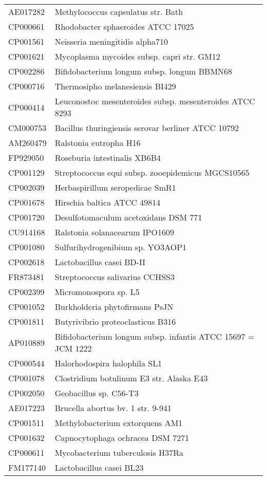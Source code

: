 \begin{longtable}{ll}
AE017282 & Methylococcus capsulatus str. Bath\\
CP000661 & Rhodobacter sphaeroides ATCC 17025\\
CP001561 & Neisseria meningitidis alpha710\\
CP001621 & Mycoplasma mycoides subsp. capri str. GM12\\
CP002286 & Bifidobacterium longum subsp. longum BBMN68\\
CP000716 & Thermosipho melanesiensis BI429\\
CP000414 & Leuconostoc mesenteroides subsp. mesenteroides ATCC 8293\\
CM000753 & Bacillus thuringiensis serovar berliner ATCC 10792\\
AM260479 & Ralstonia eutropha H16\\
FP929050 & Roseburia intestinalis XB6B4\\
CP001129 & Streptococcus equi subsp. zooepidemicus MGCS10565\\
CP002039 & Herbaspirillum seropedicae SmR1\\
CP001678 & Hirschia baltica ATCC 49814\\
CP001720 & Desulfotomaculum acetoxidans DSM 771\\
CU914168 & Ralstonia solanacearum IPO1609\\
CP001080 & Sulfurihydrogenibium sp. YO3AOP1\\
CP002618 & Lactobacillus casei BD-II\\
FR873481 & Streptococcus salivarius CCHSS3\\
CP002399 & Micromonospora sp. L5\\
CP001052 & Burkholderia phytofirmans PsJN\\
CP001811 & Butyrivibrio proteoclasticus B316\\
AP010889 & Bifidobacterium longum subsp. infantis ATCC 15697 = JCM 1222\\
CP000544 & Halorhodospira halophila SL1\\
CP001078 & Clostridium botulinum E3 str. Alaska E43\\
CP002050 & Geobacillus sp. C56-T3\\
AE017223 & Brucella abortus bv. 1 str. 9-941\\
CP001511 & Methylobacterium extorquens AM1\\
CP001632 & Capnocytophaga ochracea DSM 7271\\
CP000611 & Mycobacterium tuberculosis H37Ra\\
FM177140 & Lactobacillus casei BL23\\

\end{longtable}
